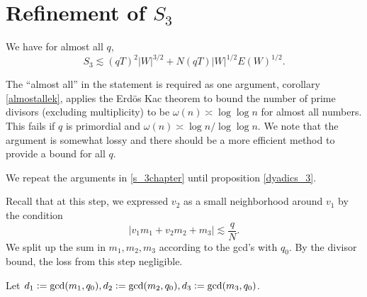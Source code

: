 \section{Refinement of $S_3$}

\begin{proposition} \label{s3refined}
    We have for almost all $q$,
    \[
S_3 \lesssim (qT)^{2}| W|^{3/2}+N(qT)| W|^{1/2}E( W)^{1/2}.
\]
\end{proposition}
\begin{remark}
    The ``almost all'' in the statement is required as one argument, corollary \ref{almostallek}, applies the Erd\"os Kac theorem to bound the number of prime divisors
    (excluding multiplicity) to be $\omega(n) \asymp \log \log n$ for almost all numbers. This fails if $q$ is primordial and $\omega(n)\asymp \log n / \log \log n$. We note that the argument is somewhat lossy and there should be a more efficient method to provide a bound for all $q$. 
\end{remark}
We repeat the arguments in \ref{s_3chapter} until proposition \ref{dyadics_3}.

Recall that at this step, we expressed $v_2$ as a small neighborhood around $v_1$ by the condition \[
|v_1m_1+v_2m_2+m_3|\lesssim \frac{q}{N}.
\] 
We split up the sum in $m_1,m_2,m_3$ according to the gcd's with $q_0$. By the divisor bound, the loss from this step negligible.

Let $d_1\mathrel{\mathop:}= \gcd (m_1,q_0),d_2\mathrel{\mathop:}= \gcd(m_2,q_0), d_3\mathrel{\mathop:}= \gcd (m_3,q_0)$. 


